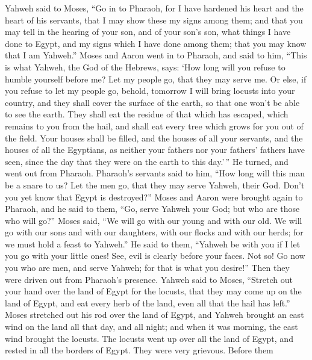  Yahweh said to Moses, ``Go in to Pharaoh, for I have
hardened his heart and the heart of his servants, that I may show these
my signs among them;  and that you may tell in the hearing
of your son, and of your son's son, what things I have done to Egypt,
and my signs which I have done among them; that you may know that I am
Yahweh.''  Moses and Aaron went in to Pharaoh, and said to
him, ``This is what Yahweh, the God of the Hebrews, says: `How long will
you refuse to humble yourself before me? Let my people go, that they may
serve me.  Or else, if you refuse to let my people go,
behold, tomorrow I will bring locusts into your country, 
and they shall cover the surface of the earth, so that one won't be able
to see the earth. They shall eat the residue of that which has escaped,
which remains to you from the hail, and shall eat every tree which grows
for you out of the field.  Your houses shall be filled,
and the houses of all your servants, and the houses of all the
Egyptians, as neither your fathers nor your fathers' fathers have seen,
since the day that they were on the earth to this day.'\,'' He turned,
and went out from Pharaoh.  Pharaoh's servants said to
him, ``How long will this man be a snare to us? Let the men go, that
they may serve Yahweh, their God. Don't you yet know that Egypt is
destroyed?''  Moses and Aaron were brought again to
Pharaoh, and he said to them, ``Go, serve Yahweh your God; but who are
those who will go?''  Moses said, ``We will go with our
young and with our old. We will go with our sons and with our daughters,
with our flocks and with our herds; for we must hold a feast to
Yahweh.''  He said to them, ``Yahweh be with you if I let
you go with your little ones! See, evil is clearly before your faces.
 Not so! Go now you who are men, and serve Yahweh; for
that is what you desire!'' Then they were driven out from Pharaoh's
presence.  Yahweh said to Moses, ``Stretch out your hand
over the land of Egypt for the locusts, that they may come up on the
land of Egypt, and eat every herb of the land, even all that the hail
has left.''  Moses stretched out his rod over the land of
Egypt, and Yahweh brought an east wind on the land all that day, and all
night; and when it was morning, the east wind brought the locusts.
 The locusts went up over all the land of Egypt, and
rested in all the borders of Egypt. They were very grievous. Before them
